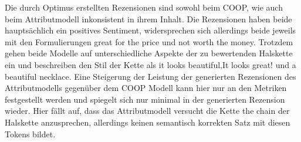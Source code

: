 Die durch Optimus erstellten Rezensionen sind sowohl beim COOP, wie auch beim Attributmodell inkonsistent in ihrem Inhalt. 
Die Rezensionen haben beide hauptsächlich ein positives Sentiment, widersprechen sich allerdings beide jeweils mit den Formulierungen \glqq{}great for the price\grqq{} und \glqq{}not worth the money\grqq{}.
Trotzdem gehen beide Modelle auf unterschiedliche Aspekte der zu bewertenden Halskette ein und beschreiben den Stil der Kette als \glqq{}it looks beautiful\grqq{},\glqq{}It looks great!\grqq{} und \glqq{}a beautiful necklace\grqq{}.
Eine Steigerung der Leistung der generierten Rezensionen des Attributmodells gegenüber dem COOP Modell kann hier nur an den Metriken festgestellt werden und spiegelt sich nur minimal in der generierten Rezension wieder.
Hier fällt auf, dass das Attributmodell versucht die Kette \glqq{}the chain\grqq{} der Halskette anzusprechen, allerdings keinen semantisch korrekten Satz mit diesen Tokens bildet.

